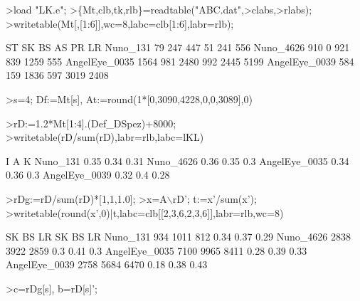 \documentclass[a4paper,10pt]{article}
\begin{document}
\begin{eulernotebook}
\begin{eulerprompt}
>load "LK.e";
>\{Mt,clb,tk,rlb\}=readtable("ABC.dat",>clabs,>rlabs);
>writetable(Mt[,[1:6]],wc=8,labc=clb[1:6],labr=rlb);
\end{eulerprompt}
\begin{euleroutput}
                ST      SK      BS      AS      PR      LR
  Nuno_131      79     247     447      51     241     556
  Nuno_4626     910       0     921     839    1259     555
  AngelEye_0035    1564     981    2480     992    2445    5199
  AngelEye_0039     584     159    1836     597    3019    2408
\end{euleroutput}
\begin{eulerprompt}
>s=4; Df:=Mt[s], At:=round(1*[0,3090,4228,0,0,3089],0)
\end{eulerprompt}
\begin{euleroutput}
  [584,  159,  1836,  597,  3019,  2408,  0,  673,  466,  0,  0,  0]
  [0,  3090,  4228,  0,  0,  3089]
\end{euleroutput}
\begin{eulerprompt}
>rD:=1.2*Mt[1:4].(Def_DSpez)+8000;
>writetable(rD/sum(rD),labr=rlb,labc=lKL)
\end{eulerprompt}
\begin{euleroutput}
                     I         A         K
    Nuno_131      0.35      0.34      0.31
   Nuno_4626      0.36      0.35       0.3
  AngelEye_0035      0.34      0.36       0.3
  AngelEye_0039      0.32       0.4      0.28
\end{euleroutput}
\begin{eulerprompt}
>rDg:=rD/sum(rD)*[1,1,1.0];
>x=A\(\backslash\)rD'; t:=x'/sum(x');
>writetable(round(x',0)|t,labc=clb[[2,3,6,2,3,6]],labr=rlb,wc=8)
\end{eulerprompt}
\begin{euleroutput}
                SK      BS      LR      SK      BS      LR
  Nuno_131     934    1011     812    0.34    0.37    0.29
  Nuno_4626    2838    3922    2859     0.3    0.41     0.3
  AngelEye_0035    7100    9965    8411    0.28    0.39    0.33
  AngelEye_0039    2758    5684    6470    0.18    0.38    0.43
\end{euleroutput}
\begin{eulerprompt}
>c=rDg[s], b=rD[s]';
\end{eulerprompt}
\begin{euleroutput}
  [0.31976,  0.396909,  0.28333]
\end{euleroutput}

\end{eulernotebook}
\end{document}
